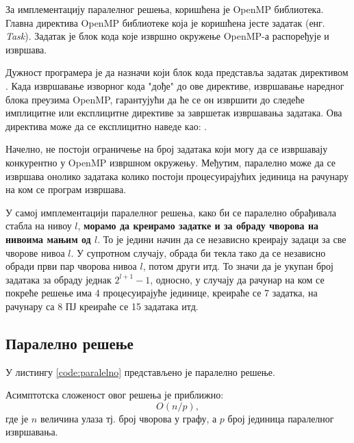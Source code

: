 За имплементацију паралелног решења, коришћена је OpenMP библиотека.
Главна директива OpenMP библиотеке која је коришћена јесте задатак (енг. \textit{Task}).
Задатак је блок кода које извршно окружење OpenMP-а распоређује и извршава.

Дужност програмера је да назначи који блок кода представља задатак директивом .
Када извршавање изворног кода "дође" до ове директиве, извршавање наредног блока преузима OpenMP,
гарантујући да ће се он извршити до следеће имплицитне или експлицитне директиве за завршетак извршавања задатака.
Ова директива може да се експлицитно наведе као: .

Начелно, не постоји ограничење на број задатака који могу да се извршавају конкурентно у OpenMP извршном окружењу.
Међутим, паралелно може да се извршава онолико задатака колико постоји процесуирајућих јединица на рачунару на ком
се програм извршава.

У самој имплементацији паралелног решења, како би се паралелно обрађивала стабла на нивоу $l$, \textbf{морамо да
креирамо задатке и за обраду чворова на нивоима мањим од $l$}.
То је једини начин да се независно креирају задаци за све чворове нивоа $l$. У супротном случају,
обрада би текла тако да се независно обради први пар чворова нивоа $l$, потом други итд.
То значи да је укупан број задатака за обраду једнак $2^{l+1} - 1$, односно, у случају да рачунар на ком се покреће решење има
4 процесуирајуће јединице, креираће се 7 задатка, на рачунару са 8 ПЈ креираће се 15 задатака итд.

\subsection{Паралелно решење}

У листингу \ref{code:paralelno} представљено је паралелно решење. 


Асимптотска сложеност овог решења је приближно:
$$O(n/p),$$
где је $n$ величина улаза тј. број чворова у графу, а $p$ број јединица паралелног извршавања.

\pagebreak